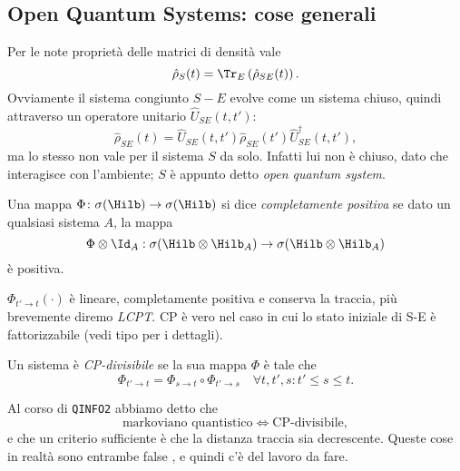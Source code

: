 \documentclass[a4]{article}
\begin{document}
\subsection{Open Quantum Systems: cose generali}
Per le note proprietà delle matrici di densità vale 
\[\hat{\rho}_S(t) = \Tr_E\left(\hat{\rho}_{SE}(t)\right).\]
Ovviamente il sistema congiunto \(S-E\) evolve come un sistema chiuso, quindi attraverso un
operatore unitario \(\hat{U}_{SE}(t, t')\):
\[\hat{\rho}_{SE}(t) = \hat{U}_{SE}(t, t') \hat{\rho}_{SE}(t') \hat{U}^{\dag}_{SE}(t, t'),\]
ma lo stesso non vale per il sistema \(S\) da solo. Infatti lui non è chiuso, dato che interagisce
con l'ambiente; \(S\) è appunto detto \emph{open quantum system}.

\begin{defn} Una mappa \(\Phi\colon \sigma(\Hilb) \to \sigma(\Hilb) \)
si dice \emph{completamente positiva} se dato un qualsiasi sistema \(A\), la mappa
\[\Phi \otimes \Id_A: \sigma(\Hilb \otimes \Hilb_A) \to \sigma(\Hilb \otimes \Hilb_A) \]
è positiva.
\end{defn}

\(\Phi_{t'\to t}(\cdot)\) è lineare, completamente positiva e conserva la traccia,
più brevemente  diremo \emph{LCPT}. CP è vero nel caso in cui lo stato iniziale di
S-E è fattorizzabile (vedi tipo \cite{breuer2007theory} per i dettagli).

\begin{defn} Un sistema è \emph{CP-divisibile} se la sua
mappa \(\Phi\) è tale che
\begin{equation} \label{eq:CPdiv}
\Phi_{t'\to t} = \Phi_{s\to t} \circ \Phi_{t'\to s} \quad \forall t, t', s: t' \le s \le t.
\end{equation}
\end{defn}
Al corso di \texttt{QINFO2} abbiamo detto che 
\[\text{markoviano quantistico} \iff \text{CP-divisibile}, \]
e che un criterio sufficiente è che la distanza traccia sia decrescente. Queste cose in realtà
sono entrambe false \cite{markovcondition}, e quindi c'è del lavoro da fare.
\end{document}

